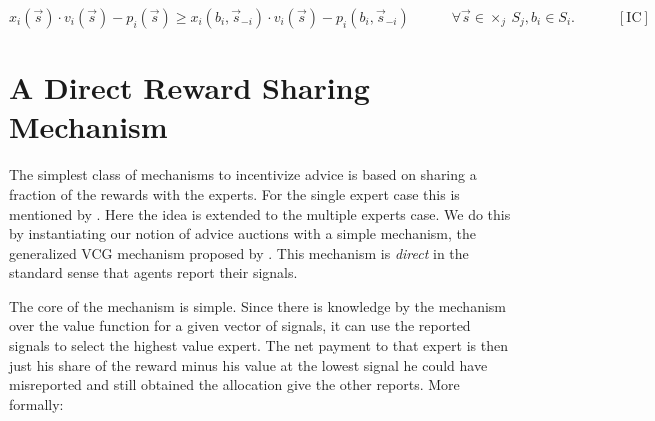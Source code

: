 $$x_i(\vec{s}) \cdot v_i(\vec{s}) - p_i(\vec{s}) \geq x_i(b_i, \vec{s}_{-i}) \cdot v_i(\vec{s}) - p_i(b_i, \vec{s}_{-i})  \quad \quad \quad  \forall \vec{s} \in \times _{j} \  S_j, b_i \in S_i. \quad\quad\quad [\text{IC}]$$






\section{A Direct Reward Sharing Mechanism}

The simplest class of mechanisms to incentivize advice is based on sharing a fraction of the rewards with the experts. For the single expert case this is mentioned by \cite{othman2010decision}. Here the idea is extended to the multiple experts case. We do this by instantiating our notion of advice auctions with a simple mechanism,
the generalized VCG mechanism proposed by \cite{maskin1992auctions}. This mechanism is \emph{direct} in the standard sense that agents report their signals. 

The core of the mechanism is simple. Since there is knowledge by the mechanism over the value function for a given vector of signals, it can use the reported signals to select the highest value expert. The net payment to that expert is then just his share of the reward minus his value at the lowest signal he could have misreported and still obtained the allocation give the other reports. More formally:

